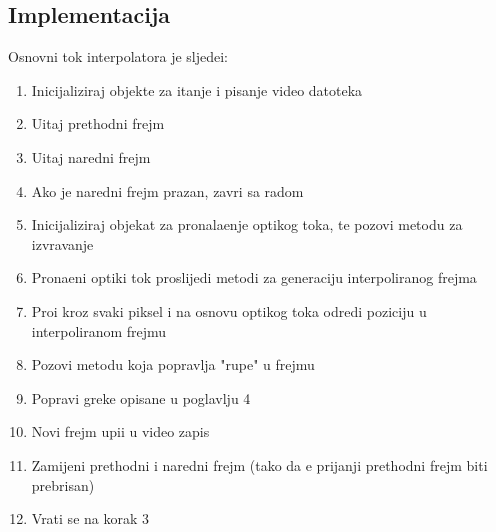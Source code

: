 \subsection{Implementacija}
Osnovni tok interpolatora je sljede\cj i:
\begin{enumerate}
\item Inicijaliziraj objekte za \ch itanje i pisanje video datoteka
\item U\ch itaj prethodni frejm
\item U\ch itaj naredni frejm
\item Ako je naredni frejm prazan, zavr\sh i sa radom
\item Inicijaliziraj objekat za pronala\zh enje opti\ch kog toka, te pozovi metodu za izvr\sh avanje
\item Prona\dj eni opti\ch ki tok proslijedi metodi za generaciju interpoliranog frejma
\item Pro\dj i kroz svaki piksel i na osnovu opti\ch kog toka odredi poziciju u interpoliranom frejmu
\item Pozovi metodu koja popravlja "rupe" u frejmu
\item Popravi gre\sh ke opisane u poglavlju 4
\item Novi frejm upi\sh i u video zapis
\item Zamijeni prethodni i naredni frejm (tako da \cj e prija\sh nji prethodni frejm biti prebrisan)
\item Vrati se na korak 3
\end{enumerate}

